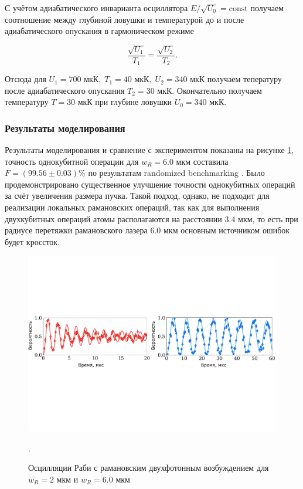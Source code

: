 С учётом адиабатического инварианта осциллятора $E/\sqrt{U_0} = \text{const}$ получаем соотношение между глубиной ловушки и температурой до и после адиабатического опускания в гармоническом режиме

\begin{equation}
	\frac{\sqrt{U_{1}}}{T_{1}} = \frac{\sqrt{U_{2}}}{T_{2}}.
\end{equation}

Отсюда для $U_{1} = 700\text{ мкК}, \; T_{1} = 40\text{ мкК}, \; U_{2} = 340\text{ мкК}$ получаем тепературу после адиабатического опускания $T_{2} = 30\text{ мкК}$. Окончательно получаем температуру $T = 30 \text{ мкК}$ при глубине ловушки $U_0 = 340\text{ мкК}$.

\subsubsection{Результаты моделирования}
\label{sec:raman_model_results}

Результаты моделирования и сравнение с экспериментом показаны на рисунке \ref{fig:ICQT_res}, точность однокубитной операции для $w_R = 6.0\text{ мкм}$ составила $F = (99.56 \pm 0.03)\%$ по результатам randomized benchmarking \cite{Hines_2023}. Было продемонстрировано существенное улучшение точности однокубитных операций за счёт увеличения размера пучка. Такой подход, однако, не подходит для реализации локальных рамановских операций, так как для выполнения двухкубитных операций атомы располагаются на расстоянии $3.4\text{ мкм}$, то есть при радиусе перетяжки рамановского лазера $6.0 \text{ мкм}$ основным источником ошибок будет кроссток. 

\begin{figure}[H]
	\centering
	\includegraphics[width=1.0\textwidth]{images/raman_ICQT_res.pdf}
	\caption{Осцилляции Раби с рамановским двухфотонным возбуждением для $w_R = 2\text{ мкм}$ и $w_R=6.0 \text{ мкм}$}. 
	\label{fig:ICQT_res}
\end{figure}


